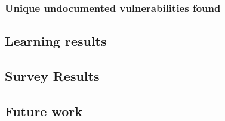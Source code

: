 \subsubsection{Unique undocumented vulnerabilities found}


\subsection{Learning results}


\subsection{Survey Results}


\subsection{Future work}

